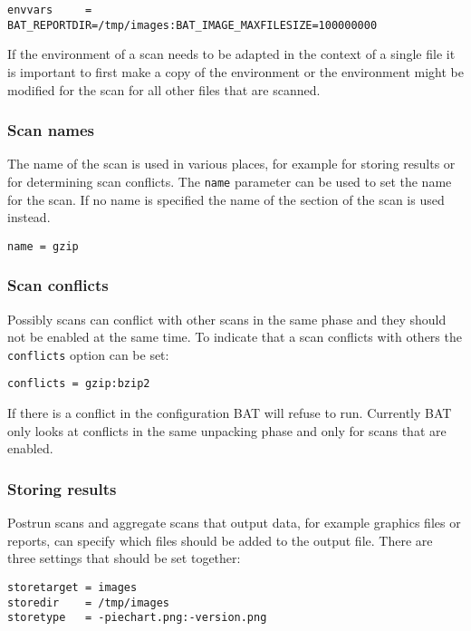 \documentclass[10pt]{article}
\begin{document}
\begin{verbatim}
envvars     = BAT_REPORTDIR=/tmp/images:BAT_IMAGE_MAXFILESIZE=100000000
\end{verbatim}

If the environment of a scan needs to be adapted in the context of a single
file it is important to first make a copy of the environment or the
environment might be modified for the scan for all other files that are scanned.

\subsubsection{Scan names}

The name of the scan is used in various places, for example for storing results
or for determining scan conflicts. The \texttt{name} parameter can be used to
set the name for the scan. If no name is specified the name of the section of
the scan is used instead.

\begin{verbatim}
name = gzip
\end{verbatim}

\subsubsection{Scan conflicts}

Possibly scans can conflict with other scans in the same phase and they should
not be enabled at the same time. To indicate that a scan conflicts with others
the \texttt{conflicts} option can be set:

\begin{verbatim}
conflicts = gzip:bzip2
\end{verbatim}

If there is a conflict in the configuration BAT will refuse to run. Currently
BAT only looks at conflicts in the same unpacking phase and only for scans that
are enabled.

\subsubsection{Storing results}

Postrun scans and aggregate scans that output data, for example graphics files
or reports, can specify which files should be added to the output file. There
are three settings that should be set together:

\begin{verbatim}
storetarget = images
storedir    = /tmp/images
storetype   = -piechart.png:-version.png
\end{verbatim}
\end{document}
